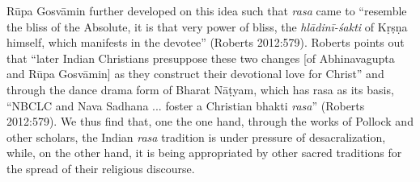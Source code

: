 Rūpa Gosvāmin further developed on this idea such that \textsl{rasa} came to ``resemble the bliss of the Absolute, it is that very power of bliss, the \textsl{hlādinī-śakti} of Kṛṣṇa himself, which manifests in the devotee'' (Roberts 2012:579). Roberts points out that ``later Indian Christians presuppose these two changes [of Abhinavagupta and Rūpa Gosvāmin] as they construct their devotional love for Christ'' and through the dance drama form of Bharat Nāṭyam, which has rasa as its basis, ``NBCLC and Nava Sadhana ... foster a Christian bhakti \textsl{rasa}'' (Roberts 2012:579). We thus find that, one the one hand, through the works of Pollock and other scholars, the Indian \textsl{rasa} tradition is under pressure of desacralization, while, on the other hand, it is being appropriated by other sacred traditions for the spread of their religious discourse.

